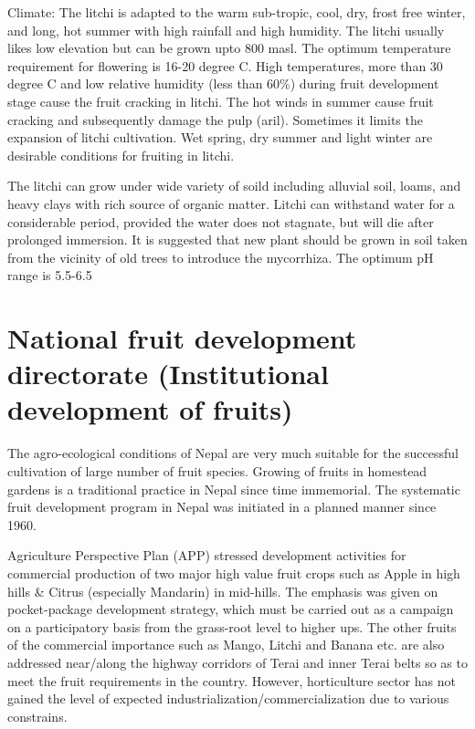 \documentclass[
  openany]{book}
\begin{document}
Climate: The litchi is adapted to the warm sub-tropic, cool, dry, frost free winter, and long, hot summer with high rainfall and high humidity. The litchi usually likes low elevation but can be grown upto 800 masl. The optimum temperature requirement for flowering is 16-20 degree C. High temperatures, more than 30 degree C and low relative humidity (less than 60\%) during fruit development stage cause the fruit cracking in litchi. The hot winds in summer cause fruit cracking and subsequently damage the pulp (aril). Sometimes it limits the expansion of litchi cultivation. Wet spring, dry summer and light winter are desirable conditions for fruiting in litchi.

The litchi can grow under wide variety of soild including alluvial soil, loams, and heavy clays with rich source of organic matter. Litchi can withstand water for a considerable period, provided the water does not stagnate, but will die after prolonged immersion. It is suggested that new plant should be grown in soil taken from the vicinity of old trees to introduce the mycorrhiza. The optimum pH range is 5.5-6.5

\hypertarget{national-fruit-development-directorate-institutional-development-of-fruits}{%
\section{National fruit development directorate (Institutional development of fruits)}\label{national-fruit-development-directorate-institutional-development-of-fruits}}

The agro-ecological conditions of Nepal are very much suitable for the successful cultivation of large number of fruit species. Growing of fruits in homestead gardens is a traditional practice in Nepal since time immemorial. The systematic fruit development program in Nepal was initiated in a planned manner since 1960.

Agriculture Perspective Plan (APP) stressed development activities for commercial production of two major high value fruit crops such as Apple in high hills \& Citrus (especially Mandarin) in mid-hills. The emphasis was given on pocket-package development strategy, which must be carried out as a campaign on a participatory basis from the grass-root level to higher ups. The other fruits of the commercial importance such as Mango, Litchi and Banana etc. are also addressed near/along the highway corridors of Terai and inner Terai belts so as to meet the fruit requirements in the country. However, horticulture sector has not gained the level of expected industrialization/commercialization due to various constrains.
\end{document}
